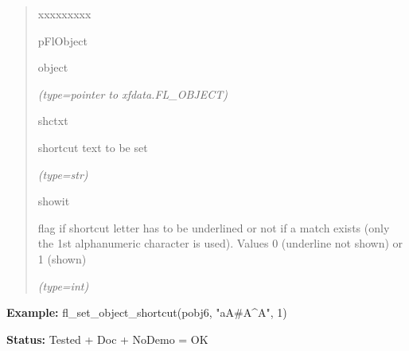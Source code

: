 \begin{boxedminipage}{\funcwidth}
\begin{quote}
\begin{Ventry}{xxxxxxxxx}
          \item[pFlObject]

          object

            {\it (type=pointer to xfdata.FL\_OBJECT)}

          \item[shctxt]

          shortcut text to be set

            {\it (type=str)}

          \item[showit]

          flag if shortcut letter has to be underlined or not if a match 
          exists (only the 1st alphanumeric character is used). Values 0 
          (underline not shown) or 1 (shown)

            {\it (type=int)}

        \end{Ventry}

      \end{quote}

\textbf{Example:} fl\_set\_object\_shortcut(pobj6, "aA\#A{\textasciicircum}A", 1)



\textbf{Status:} Tested + Doc + NoDemo = OK



    \end{boxedminipage}

    \label{xformslib:flbasic:fl_set_object_shortcutkey}

    \vspace{0.5ex}

